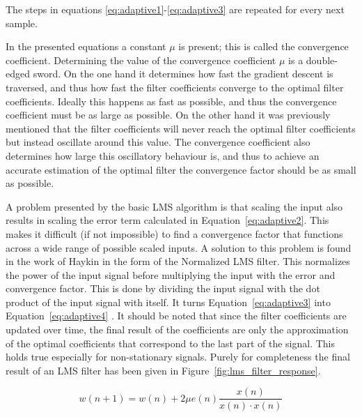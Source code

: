 The steps in equations \ref{eq:adaptive1}-\ref{eq:adaptive3} are repeated for every next sample.

In the presented equations a constant $\mu$ is present; this is called the convergence coefficient. Determining the value of the convergence coefficient $\mu$ is a double-edged sword. On the one hand it determines how fast the gradient descent is traversed, and thus how fast the filter coefficients converge to the optimal filter coefficients. Ideally this happens as fast as possible, and thus the convergence coefficient must be as large as possible. On the other hand it was previously mentioned that the filter coefficients will never reach the optimal filter coefficients but instead oscillate around this value. The convergence coefficient also determines how large this oscillatory behaviour is, and thus to achieve an accurate estimation of the optimal filter the convergence factor should be as small as possible. 

A problem presented by the basic LMS algorithm is that scaling the input also results in scaling the error term calculated in Equation~\ref{eq:adaptive2}. This makes it difficult (if not impossible) to find a convergence factor that functions across a wide range of possible scaled inputs. A solution to this problem is found in the work of Haykin \cite{adaptive_filter_theory} in the form of the Normalized LMS filter. This normalizes the power of the input signal before multiplying the input with the error and convergence factor. This is done by dividing the input signal with the  dot product of the input signal with itself. It turns Equation~\ref{eq:adaptive3} into Equation~\ref{eq:adaptive4} \cite{adaptive_filter_theory}. It should be noted that since the filter coefficients are updated over time, the final result of the coefficients are only the approximation of the optimal coefficients that correspond to the last part of the signal. This holds true especially for non-stationary signals. Purely for completeness the final result of an LMS filter has been given in Figure~\ref{fig:lms_filter_response}.

\begin{equation}\label{eq:adaptive4}
    w(n+1) = w(n) + 2 \mu e(n)  \frac{x(n)}{x(n) \cdot x(n)}
\end{equation}

